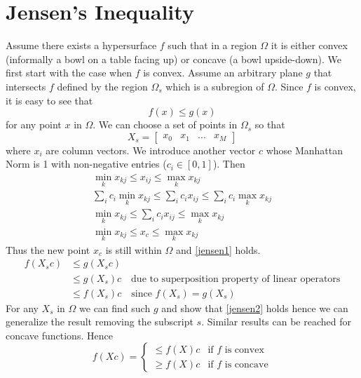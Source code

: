 \documentclass{book}
\numberwithin{equation}{subsection}
\begin{document}
\section{Jensen's Inequality}
Assume there exists a hypersurface $f$ such that in a region $\Omega$ it is either convex (informally a bowl on a table facing up) or concave (a bowl upside-down). We first start with the case when $f$ is convex. Assume an arbitrary plane $g$ that intersects $f$ defined by the region $\Omega_s$ which is a subregion of $\Omega$. Since $f$ is convex, it is easy to see that 
\begin{equation}
    f(x) \leq g(x) \label{jensen1}
\end{equation}
for any point $x$ in $\Omega$.
We can choose a set of points in $\Omega_s$ so that
\begin{equation}
    X_s = 
    \begin{bmatrix}
        x_0 & x_1 & ... & x_M   
    \end{bmatrix}
\end{equation}
where $x_i$ are column vectors. We introduce another vector $c$ whose Manhattan Norm is 1 with non-negative entries ($c_i \in [0, 1]$). Then
\begin{align}
    \min_k x_{kj} \leq x_{ij} \leq \max_k x_{kj}\\
    \sum_i c_i \min_k x_{kj} \leq \sum_i c_i x_{ij} \leq \sum_i c_i \max_k x_{kj}\\
    \min_k x_{kj} \leq \sum_i c_i x_{ij} \leq \max_k x_{kj}\\
    \min_k x_{kj} \leq x_c \leq \max_k x_{kj}
\end{align}
Thus the new point $x_c$ is still within $\Omega$ and \ref{jensen1} holds.
\begin{align}
    f(X_sc) &\leq g(X_sc)\\
    &\leq g(X_s)c \quad \text{due to superposition property of linear operators}\\
    &\leq f(X_s)c \quad \text{since $f(X_s) = g(X_s)$} \label{jensen2}
\end{align}
For any $X_s$ in $\Omega$ we can find such $g$ and show that \ref{jensen2} holds hence we can generalize the result removing the subscript $s$. Similar results can be reached for concave functions. Hence
\begin{equation}
    f(Xc) = \begin{cases}
    \leq f(X)c & \text{if $f$ is convex}\\
    \geq f(X)c & \text{if $f$ is concave}
    \end{cases}
\end{equation}
\end{document}
